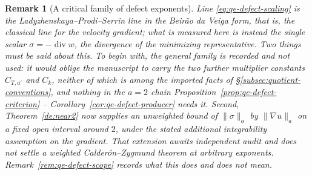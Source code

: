 \documentclass[11pt]{article}
\newtheorem{remark}[theorem]{Remark}
\theoremstyle{definition}
\theoremstyle{plain}
\newcommand{\norm}[1]{\lVert #1\rVert}
\begin{document}
\begin{remark}[A critical family of defect exponents]
Line \eqref{eq:qe-defect-scaling} is the Ladyzhenskaya--Prodi--Serrin line
in the Beir\~ao da Veiga form, that is, the classical line for the
\emph{velocity gradient}; what is measured here is instead the single
scalar $\sigma=-\operatorname{div}w$, the divergence of the minimizing
representative.  Two things must be said about this.  To begin with, the general
family is recorded and not used: it would oblige the manuscript to carry
the two further multiplier constants $C_{T,a'}$ and $C_k$, neither of which
is among the imported facts of
\S\ref{subsec:quotient-conventions}, and nothing in the $a=2$ chain
Proposition~\ref{prop:qe-defect-criterion} --
Corollary~\ref{cor:qe-defect-producer} needs it.  Second, Theorem~\ref{de:near2} now supplies an unweighted bound of
$\norm\sigma_a$ by $\norm{\nabla u}_a$ on a fixed open interval around
$2$, under the stated additional integrability assumption on the gradient.
That extension awaits independent audit and does not settle a weighted
Calder\'on--Zygmund theorem at arbitrary exponents.  Remark~\ref{rem:qe-defect-scope}
records what this does and does not mean.
\end{remark}
\end{document}
